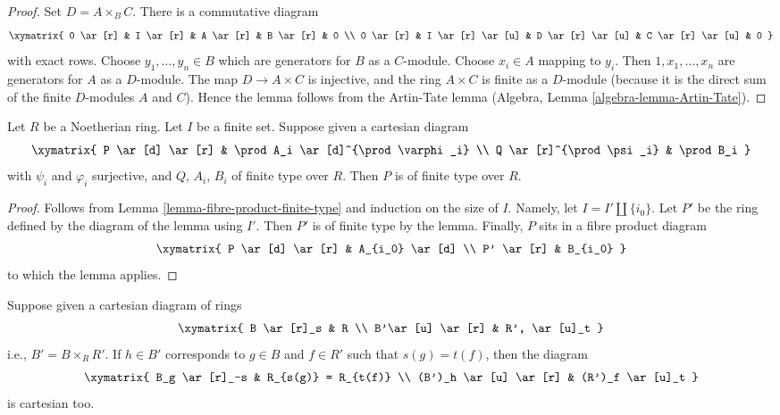 \begin{proof}
Set $D = A \times_B C$. There is a commutative diagram
$$
\xymatrix{
0 \ar[r] &
I \ar[r] &
A \ar[r] &
B \ar[r] &
0 \\
0 \ar[r] &
I \ar[r] \ar[u] &
D \ar[r] \ar[u] &
C \ar[r] \ar[u] &
0
}
$$
with exact rows. Choose $y_1, \ldots, y_n \in B$ which are generators for
$B$ as a $C$-module. Choose $x_i \in A$ mapping to $y_i$.
Then $1, x_1, \ldots, x_n$ are generators for $A$ as a $D$-module.
The map $D \to A \times C$ is injective, and the ring $A \times C$ is finite
as a $D$-module (because it is the direct sum of the finite $D$-modules
$A$ and $C$). Hence the lemma follows from the Artin-Tate lemma
(Algebra, Lemma \ref{algebra-lemma-Artin-Tate}).
\end{proof}

\begin{lemma}
\label{lemma-formal-consequence}
Let $R$ be a Noetherian ring. Let $I$ be a finite set. Suppose given a
cartesian diagram
$$
\xymatrix{
P \ar[d] \ar[r] & \prod A_i \ar[d]^{\prod \varphi_i} \\
Q \ar[r]^{\prod \psi_i} & \prod B_i
}
$$
with $\psi_i$ and $\varphi_i$ surjective, and $Q$, $A_i$, $B_i$ of
finite type over $R$. Then $P$ is of finite type over $R$.
\end{lemma}

\begin{proof}
Follows from Lemma \ref{lemma-fibre-product-finite-type}
and induction on the size of $I$.
Namely, let $I = I' \amalg \{i_0\}$. Let $P'$ be the ring defined
by the diagram of the lemma using $I'$. Then $P'$ is of finite type
by the lemma. Finally, $P$ sits in a fibre product diagram
$$
\xymatrix{
P \ar[d] \ar[r] & A_{i_0} \ar[d] \\
P' \ar[r] & B_{i_0}
}
$$
to which the lemma applies.
\end{proof}

\begin{lemma}
\label{lemma-diagram-localize}
Suppose given a cartesian diagram of rings
$$
\xymatrix{
B \ar[r]_s & R \\
B'\ar[u] \ar[r] & R', \ar[u]_t
}
$$
i.e., $B' = B \times_R R'$. If $h \in B'$ corresponds to $g \in B$
and $f \in R'$ such that $s(g) = t(f)$, then the diagram
$$
\xymatrix{
B_g \ar[r]_-s & R_{s(g)} = R_{t(f)} \\
(B')_h \ar[u] \ar[r] & (R')_f \ar[u]_t
}
$$
is cartesian too.
\end{lemma}

